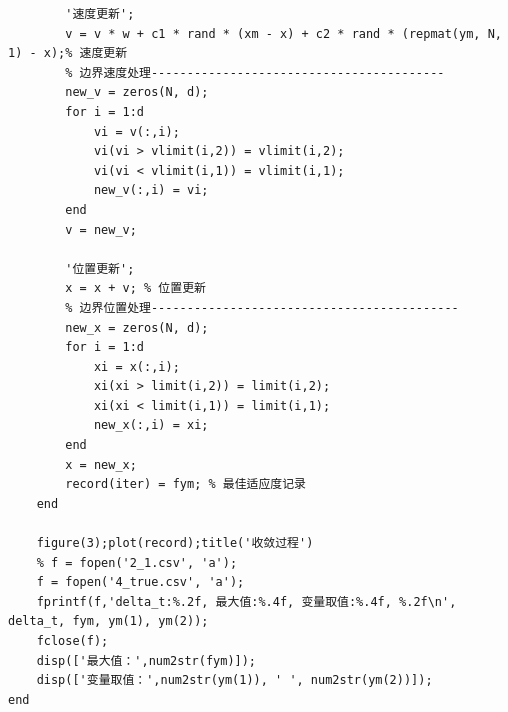 \documentclass{my_paper}
\begin{document}
\begin{lstlisting}
        '速度更新';
        v = v * w + c1 * rand * (xm - x) + c2 * rand * (repmat(ym, N, 1) - x);% 速度更新
        % 边界速度处理-----------------------------------------
        new_v = zeros(N, d);
        for i = 1:d
            vi = v(:,i);
            vi(vi > vlimit(i,2)) = vlimit(i,2);
            vi(vi < vlimit(i,1)) = vlimit(i,1);
            new_v(:,i) = vi;
        end
        v = new_v;

        '位置更新';
        x = x + v; % 位置更新
        % 边界位置处理-------------------------------------------
        new_x = zeros(N, d);
        for i = 1:d
            xi = x(:,i);
            xi(xi > limit(i,2)) = limit(i,2);
            xi(xi < limit(i,1)) = limit(i,1);
            new_x(:,i) = xi;
        end
        x = new_x;
        record(iter) = fym; % 最佳适应度记录
    end

    figure(3);plot(record);title('收敛过程')
    % f = fopen('2_1.csv', 'a');
    f = fopen('4_true.csv', 'a');
    fprintf(f,'delta_t:%.2f, 最大值:%.4f, 变量取值:%.4f, %.2f\n', delta_t, fym, ym(1), ym(2));
    fclose(f);
    disp(['最大值：',num2str(fym)]);
    disp(['变量取值：',num2str(ym(1)), ' ', num2str(ym(2))]);
end
\end{lstlisting}
\end{document}
